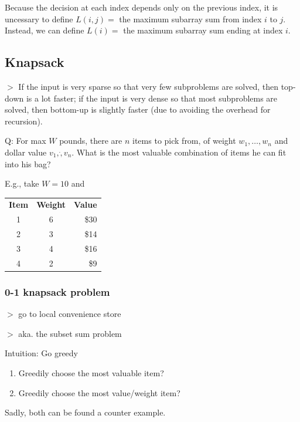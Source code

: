 \documentclass[12pt,a4paper]{article}
\newcommand{\remark}[1]{
    {\small $>$ {\color{blue} #1}}
}
\begin{document}
Because the decision at each index depends only on the previous index,
it is uncessary to define $L(i, j) = $ the maximum subarray sum from index $i$ to $j$.
Instead, we can define $L(i) = $ the maximum subarray sum ending at index $i$.

\subsection*{Knapsack}

\remark{If the input is very sparse so that very few subproblems are solved, then top-down is a lot faster; if the input is very dense so that most subproblems are solved, then bottom-up is slightly faster (due to avoiding the overhead for recursion).}

Q: For max $W$ pounds, there are $n$ items to pick from, of weight $w_1, \dots, w_n$ and dollar value $v_1, \dot, v_n$. 
What is the most valuable combination of items he can fit into his bag?

E.g., take $W = 10$ and 

\begin{table}[h]
    \centering
    \begin{tabular}{c c r}
        \textbf{Item} & \textbf{Weight} & \textbf{Value} \\
        1 & 6 & \$30 \\
        2 & 3 & \$14 \\
        3 & 4 & \$16 \\
        4 & 2 & \$9 \\
    \end{tabular}
\end{table}

\subsubsection*{0-1 knapsack problem}

\remark{go to local convenience store}

\remark{aka. the subset sum problem}

Intuition: Go greedy

\begin{enumerate}
  \item Greedily choose the most valuable item?
  \item Greedily choose the most value/weight item?
\end{enumerate}

Sadly, both can be found a counter example.
\end{document}
